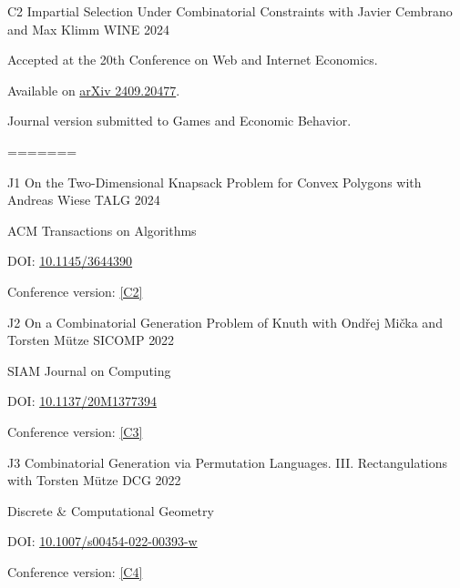 \vspace{2 mm}


\begin{cvpublications}
\cvpublication
{C2} %
{Impartial Selection Under Combinatorial Constraints} %
{with Javier Cembrano and Max Klimm} %
{WINE} %
{2024}
{
\begin{cvitems} %
  \item Accepted at the 20th Conference on Web and Internet Economics.
  \item[] Available on \href{https://arxiv.org/abs/2409.20477}{arXiv 2409.20477}.
  \item Journal version submitted to Games and Economic Behavior. 
\end{cvitems}
}


\vspace{5 mm}
\end{cvpublications}
=======
\begin{cvpublication}
	{J1}
	{On the Two-Dimensional Knapsack Problem for Convex Polygons}
	{with Andreas Wiese}
	{TALG}
	{2024}
    {
	\begin{cvitems}
	\item ACM Transactions on Algorithms
	\item[] DOI: \href{https://doi.org/10.1145/3644390}{10.1145/3644390}
	\item Conference version: \hyperlink{paperC2}{[C2]}
	\end{cvitems}
	}
\end{cvpublication}
\begin{cvpublication}
	{J2}
	{On a Combinatorial Generation Problem of Knuth}
	{with Ondřej Mička and Torsten Mütze}
	{SICOMP}
	{2022}
    {
	\begin{cvitems}
	\item SIAM Journal on Computing
	\item[] DOI: \href{https://doi.org/10.1137/20M1377394}{10.1137/20M1377394}
	\item Conference version: \hyperlink{paperC3}{[C3]}
	\end{cvitems}
	}
\end{cvpublication}
\begin{cvpublication}
	{J3}
	{Combinatorial Generation via Permutation Languages. III. Rectangulations}
	{with Torsten Mütze}
	{DCG}
	{2022}
    {
	\begin{cvitems}
	\item Discrete & Computational Geometry
	\item[] DOI: \href{https://doi.org/10.1007/s00454-022-00393-w}{10.1007/s00454-022-00393-w}
	\item Conference version: \hyperlink{paperC4}{[C4]}
	\end{cvitems}
	}
\end{cvpublication}
